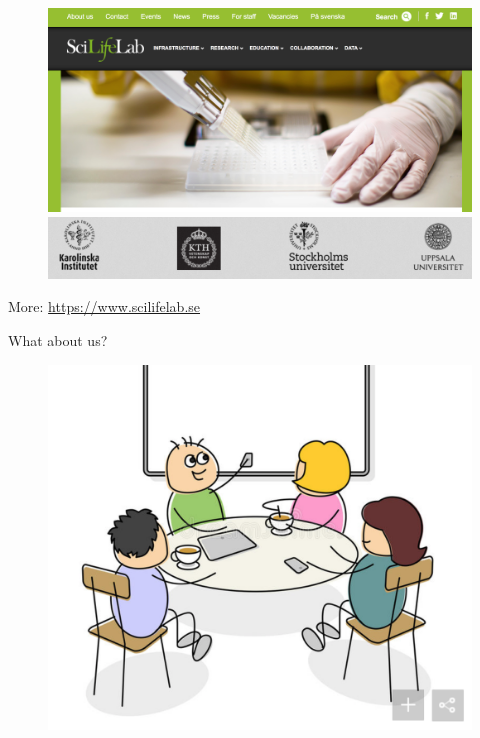 \documentclass{beamer}\usepackage[]{graphicx}\usepackage[]{color}
\begin{document}
\begin{frame}
\begin{figure}
   \includegraphics[scale=0.3]{../figures/lecture-welcome/SciLifeLab-main.png}
   \hfill
   \vspace{5mm}
   \includegraphics[scale=0.3]{../figures/lecture-welcome/SciLifeLab-logos.png}
\end{figure}
\small
More: \hyperlink{https://www.scilifelab.se}{https://www.scilifelab.se}
\end{frame}


\begin{frame}
\vspace{5mm}
What about us?
\begin{figure}
   \includegraphics[scale=0.4]{../figures/lecture-welcome/table-cartoon.png}
\end{figure}
\small
\end{frame}
\end{document}
